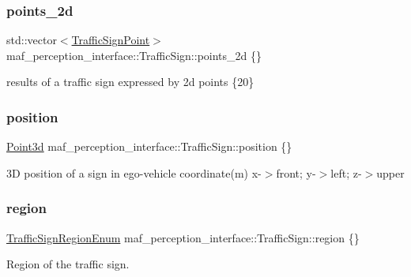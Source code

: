 \subsubsection{\texorpdfstring{points\+\_\+2d}{points\_2d}}
{\footnotesize\ttfamily std\+::vector$<$\hyperlink{structmaf__perception__interface_1_1TrafficSignPoint}{Traffic\+Sign\+Point}$>$ maf\+\_\+perception\+\_\+interface\+::\+Traffic\+Sign\+::points\+\_\+2d \{\}}

results of a traffic sign expressed by 2d points \{20\} \mbox{\label{structmaf__perception__interface_1_1TrafficSign_ae10c97bcba7615211b4cd2d06c25a929}} 
\subsubsection{\texorpdfstring{position}{position}}
{\footnotesize\ttfamily \hyperlink{structmaf__perception__interface_1_1Point3d}{Point3d} maf\+\_\+perception\+\_\+interface\+::\+Traffic\+Sign\+::position \{\}}



3D position of a sign in ego-\/vehicle coordinate(m) x-\/$>$front; y-\/$>$left; z-\/$>$upper 

\mbox{\label{structmaf__perception__interface_1_1TrafficSign_a39886b005257e582e5cbf8ea160dd8a6}} 
\subsubsection{\texorpdfstring{region}{region}}
{\footnotesize\ttfamily \hyperlink{structmaf__perception__interface_1_1TrafficSignRegionEnum}{Traffic\+Sign\+Region\+Enum} maf\+\_\+perception\+\_\+interface\+::\+Traffic\+Sign\+::region \{\}}



Region of the traffic sign. 

